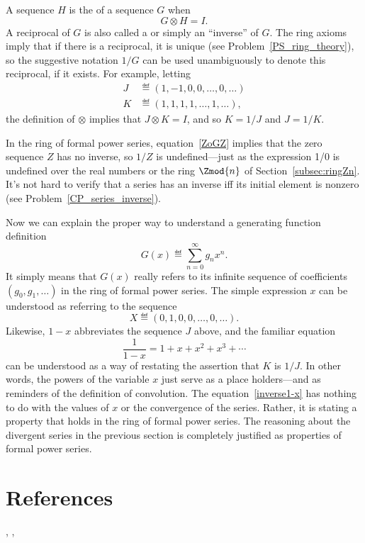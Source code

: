 A sequence $H$ is the  of a sequence $G$ when
\[
G \otimes H = I.
\]
A reciprocal of $G$ is also called a  or
simply an ``inverse'' of $G$.  The ring axioms imply that if there is
a reciprocal, it is unique (see Problem~\ref{PS_ring_theory}), so the
suggestive notation $1/G$ can be used unambiguously to denote this
reciprocal, if it exists.  For example, letting
\begin{align*}
J & \eqdef (1,-1,0,0,\dots,0,\dots)\\
K & \eqdef (1,1,1,1,\dots,1,\dots),
\end{align*}
the definition of $\otimes$ implies that $J \otimes K = I$, and so
$K = 1/J$ and $J = 1/K$.

In the ring of formal power series, equation~\eqref{ZoGZ} implies that
the zero sequence $Z$ has no inverse, so $1/Z$ is undefined---just as
the expression 1/0 is undefined over the real numbers or the ring
$\Zmod{n}$ of Section~\ref{subsec:ringZn}.  It's not hard to verify
that a series has an inverse iff its initial element is nonzero (see
Problem~\ref{CP_series_inverse}).

Now we can explain the proper way to understand a generating function
definition
\[
G(x) \eqdef \sum_{n=0}^\infty g_n x^n.
\]
It simply means that $G(x)$ really refers to its infinite sequence of
coefficients $(g_0,g_1,\dots)$ in the ring of formal power series.  The
simple expression $x$ can be understood as referring to the sequence
\[
X \eqdef (0,1,0,0,\dots,0,\dots).
\]
Likewise, $1-x$ abbreviates the sequence $J$ above, and the familiar
equation
\begin{equation}\label{inverse1-x}
\frac{1}{1-x} = 1 + x + x^2 + x^3 + \cdots
\end{equation}
can be understood as a way of restating the assertion that $K$ is
$1/J$.  In other words, the powers of the variable $x$ just serve as a
place holders---and as reminders of the definition of convolution.
The equation~\eqref{inverse1-x} has nothing to do with the values of
$x$ or the convergence of the series.  Rather, it is stating a
property that holds in the ring of formal power series.  The reasoning
about the divergent series in the previous section is completely
justified as properties of formal power series.

\begin{problems}
\practiceproblems
{}

\classproblems
{}
\end{problems}

\section{References}
\cite{Wilf90},
\cite{GrahamKP94},
\cite{Bona07}
\cite{Flajolet09}

\endinput
